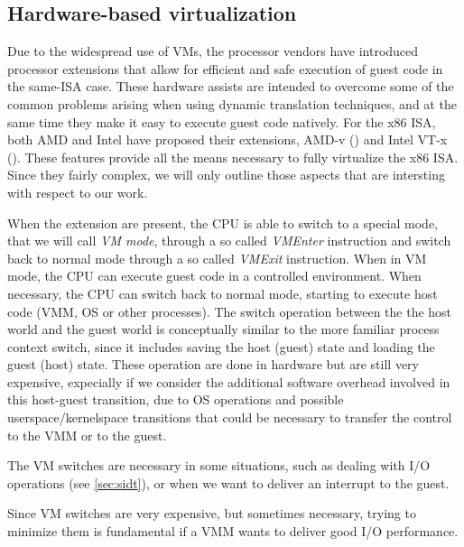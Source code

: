\subsection{Hardware-based virtualization}
\label{sec:hbv}
Due to the widespread use of VMs, the processor vendors have introduced processor extensions that allow for efficient and safe execution
of guest code in the same-ISA case. These hardware assists are intended to overcome some of the common problems arising when using
dynamic translation techniques, and at the same time they make it easy to execute guest code natively.
For the x86 ISA, both AMD and Intel have proposed their extensions, AMD-v (\cite{ref:amd-v}) and Intel VT-x (\cite{ref:intel-VT-x}).
These features provide all the means necessary to fully virtualize the x86 ISA. Since they fairly complex, we will only outline those
aspects that are intersting with respect to our work.

\vspace{0.5cm}

When the extension are present, the CPU is able to switch to a special mode, that we will call \emph{VM mode}, through a so called
\emph{VMEnter} instruction and switch back to normal mode through a so called \emph{VMExit} instruction.
When in VM mode, the CPU can execute guest code in a controlled environment. When necessary, the CPU can switch back to normal mode, 
starting to execute host code (VMM, OS or other processes).
The switch operation between the the host world and the guest world is conceptually similar to the more familiar process context switch,
since it includes saving the host (guest) state and loading the guest (host) state. These operation are done in hardware but are
still very expensive, expecially if we consider the additional software overhead involved in this host-guest transition, due to
OS operations and possible userspace/kernelspace transitions that could be necessary to transfer the control to the VMM or to the
guest.

The VM switches are necessary in some situations, such as dealing with I/O operations (see \ref{sec:sidt}), or when we want
to deliver an interrupt to the guest.

Since VM switches are very expensive, but sometimes necessary, trying to minimize them is fundamental if a VMM
wants to deliver good I/O performance.
